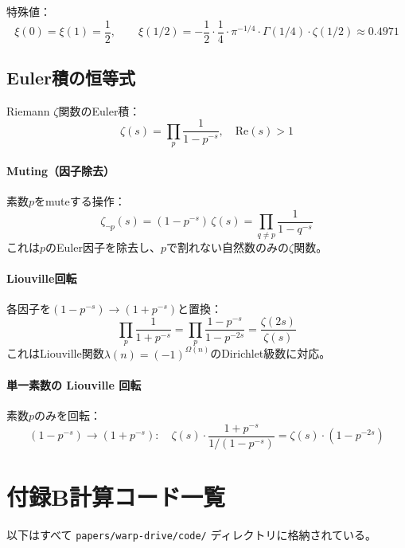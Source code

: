 特殊値：
\[
\xi(0) = \xi(1) = \frac{1}{2}, \qquad
\xi(1/2) = -\frac{1}{2}\cdot\frac{1}{4}\cdot\pi^{-1/4}\cdot\Gamma(1/4)\cdot\zeta(1/2)
\approx 0.4971
\]


\subsection{Euler積の恒等式}

Riemann $\zeta$関数のEuler積：
\[
\zeta(s) = \prod_p \frac{1}{1 - p^{-s}}, \quad \mathrm{Re}(s) > 1
\]

\paragraph{Muting（因子除去）}
素数$p$をmuteする操作：
\[
\zeta_{\neg p}(s) = (1 - p^{-s})\,\zeta(s) = \prod_{q \neq p} \frac{1}{1 - q^{-s}}
\]
これは$p$のEuler因子を除去し、$p$で割れない自然数のみの$\zeta$関数。

\paragraph{Liouville回転}
各因子を$(1 - p^{-s}) \to (1 + p^{-s})$と置換：
\[
\prod_p \frac{1}{1 + p^{-s}} = \prod_p \frac{1 - p^{-s}}{1 - p^{-2s}}
= \frac{\zeta(2s)}{\zeta(s)}
\]
これはLiouville関数$\lambda(n) = (-1)^{\Omega(n)}$のDirichlet級数に対応。

\paragraph{単一素数の Liouville 回転}
素数$p$のみを回転：
\[
(1 - p^{-s}) \to (1 + p^{-s}): \quad
\zeta(s) \cdot \frac{1 + p^{-s}}{1/(1 - p^{-s})}
= \zeta(s) \cdot (1 - p^{-2s})
\]



\section{付録B\quad 計算コード一覧}
\label{app:code}

以下はすべて \texttt{papers/warp-drive/code/} ディレクトリに格納されている。

